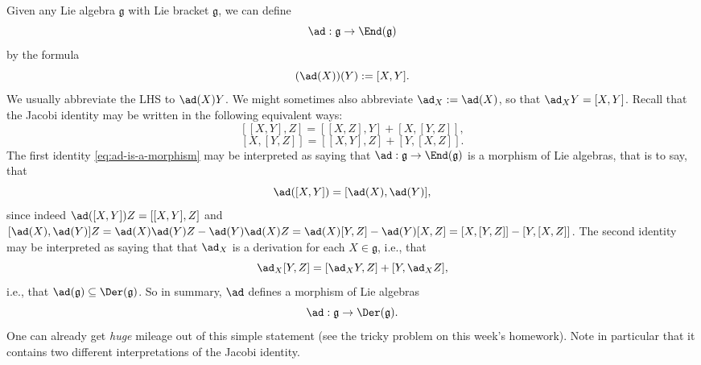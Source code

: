 \documentclass[reqno]{amsart} 
\begin{document}
\begin{definition}
  Given any Lie algebra $\mathfrak{g}$
  with Lie bracket $\mathfrak{g}$,
  we can define
  \begin{equation*}
    \ad : \mathfrak{g} \rightarrow \End(\mathfrak{g})
  \end{equation*}
  by the formula
  \begin{equation*}
    (\ad(X))(Y) := [X,Y].
  \end{equation*}
  We usually abbreviate the LHS to $\ad(X) Y$.
  We might sometimes also abbreviate $\ad_X := \ad(X)$,
  so that $\ad_X Y = [X,Y]$.
  Recall that
  the Jacobi identity may be written
  in the following equivalent ways:
  \begin{equation}\label{eq:ad-is-a-morphism}
    [[X,Y],Z] = [[X,Z],Y] + [X,[Y,Z]],
  \end{equation}
  \begin{equation}\label{eq:ad-X-is-a-derivation}
    [X,[Y,Z]] = [[X,Y],Z] + [Y,[X,Z]].
  \end{equation}
  The first identity \eqref{eq:ad-is-a-morphism}
  may be interpreted as saying that $\ad : \mathfrak{g}
  \rightarrow \End(\mathfrak{g})$
  is a morphism of Lie algebras,
  that is to say,
  that
  \begin{equation*}
    \ad([X,Y]) = [\ad(X),\ad(Y)],
  \end{equation*}
  since indeed
  $\ad([X,Y]) Z = [[X,Y],Z]$
  and
  $[\ad(X),\ad(Y)] Z
  = \ad(X) \ad(Y) Z - \ad(Y) \ad(X) Z
  = \ad(X) [Y,Z] - \ad(Y) [X,Z]
  = [X,[Y,Z]] - [Y,[X,Z]]$.
  The second identity may be interpreted
  as saying that
  that $\ad_X$ is a derivation for each $X \in \mathfrak{g}$,
  i.e.,
  that
  \begin{equation*}
    \ad_X [Y,Z] = [\ad_X Y, Z] + [Y,\ad_X Z],
  \end{equation*}
  i.e., that
  $\ad(\mathfrak{g}) \subseteq \Der(\mathfrak{g})$.
  So in summary, $\ad$ defines a morphism of Lie algebras
  \begin{equation*}
    \ad : \mathfrak{g} \rightarrow \Der(\mathfrak{g}).
  \end{equation*}
  One can already get \emph{huge} mileage out
  of this simple statement (see the tricky problem on this week's homework).
   Note in particular that it contains
  two different interpretations of the Jacobi identity.
\end{definition}
\end{document}
